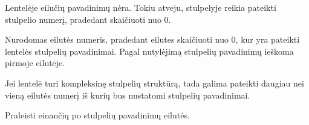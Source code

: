 \documentclass[letterpaper,10pt,lithuanian]{sphinxmanual}
\begin{document}
\begin{fulllineitems}

\pysigstartsignatures
{}
\pysigstopsignatures{}

\begin{fulllineitems}
\label{\detokenize{formules:func.header}}
\pysigstartsignatures
{}
\pysigstopsignatures

\begin{fulllineitems}

\pysigstartsignatures
{}
\pysigstopsignatures
\sphinxAtStartPar
Lentelėje eilučių pavadinimų nėra. Tokiu atveju,
{\hyperref[\detokenize{dimensijos:property.source}]{}} stulpelyje reikia pateikti stulpelio numerį,
pradedant skaičiuoti nuo 0.

\end{fulllineitems}



\begin{fulllineitems}

\pysigstartsignatures
{}
\pysigstopsignatures
\sphinxAtStartPar
Nurodomas eilutės numeris, pradedant eilutes skaičiuoti nuo 0, kur
yra pateikti lentelės stulpelių pavadinimai. Pagal nutylėjimą
stulpelių pavadinimų ieškoma pirmoje eilutėje.

\end{fulllineitems}



\begin{fulllineitems}

\pysigstartsignatures
{}
\pysigstopsignatures
\sphinxAtStartPar
Jei lentelė turi kompleksinę stulpelių struktūrą, tada galima
pateikti daugiau nei vieną eilutės numerį iš kurių bus nustatomi
stulpelių pavadinimai.

\end{fulllineitems}


\end{fulllineitems}


\begin{fulllineitems}
\label{\detokenize{formules:func.head}}
\pysigstartsignatures
{}
\pysigstopsignatures
\sphinxAtStartPar
Praleisti  einančių po stulpelių pavadinimų eilutės.


\end{fulllineitems}
\end{fulllineitems}
\end{document}
